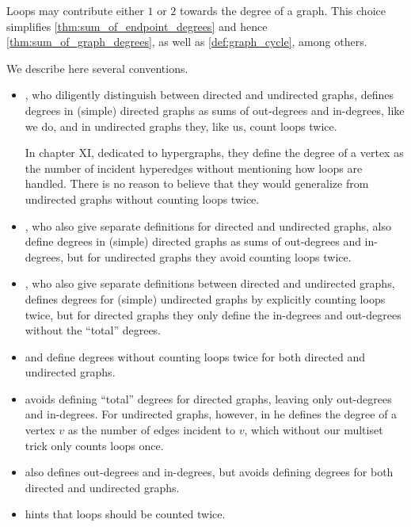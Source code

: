 \begin{remark}\label{rem:counting_loops_twice}
  Loops may contribute either \( 1 \) or \( 2 \) towards the degree of a graph. This choice simplifies \cref{thm:sum_of_endpoint_degrees} and hence \cref{thm:sum_of_graph_degrees}, as well as \cref{def:graph_cycle}, among others.

  We describe here several conventions.
  \begin{itemize}
    \item {}, who diligently distinguish between directed and undirected graphs, defines degrees in (simple) directed graphs as sums of out-degrees and in-degrees, like we do, and in undirected graphs they, like us, count loops twice.

    In chapter XI, dedicated to hypergraphs, they define the degree of a vertex as the number of incident hyperedges without mentioning how loops are handled. There is no reason to believe that they would generalize from undirected graphs without counting loops twice.

    \item {}, who also give separate definitions for directed and undirected graphs, also define degrees in (simple) directed graphs as sums of out-degrees and in-degrees, but for undirected graphs they avoid counting loops twice.

    \item {}, who also give separate definitions between directed and undirected graphs, defines degrees for (simple) undirected graphs by explicitly counting loops twice, but for directed graphs they only define the in-degrees and out-degrees without the \enquote{total} degrees.

    \item {} and  define degrees without counting loops twice for both directed and undirected graphs.

    \item {} avoids defining \enquote{total} degrees for directed graphs, leaving only out-degrees and in-degrees. For undirected graphs, however, in \cite[def. 1.1.8]{Knauer2019AlgebraicGraphTheory} he defines the degree of a vertex \( v \) as the number of edges incident to \( v \), which without our multiset trick only counts loops once.

    \item {} also defines out-degrees and in-degrees, but avoids defining degrees for both directed and undirected graphs.

    \item {} hints that loops should be counted twice.
  \end{itemize}
\end{remark}

